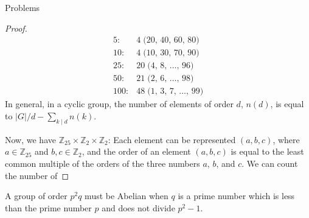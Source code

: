 \documentclass[12pt]{article}
\newcommand{\Z}{\mathbb{Z}}
\theoremstyle{definition}
\newenvironment{problem}[2][Problem]{\begin{trivlist}
\item[\hskip \labelsep {\bfseries #1}\hskip \labelsep {\bfseries #2.}]}{\end{trivlist}}
\begin{document}
\begin{section}{Problems}
\begin{problem}{12}
\begin{proof}
\begin{align*}
	    5: &4 \;\text{($20$, $40$, $60$, $80$)}\\
	    10: &4 \;\text{($10$, $30$, $70$, $90$)}\\
	    25: &20 \;\text{($4$, $8$, $\dots$, $96$)}\\
	    50: &21 \;\text{($2$, $6$, $\dots$, $98$)}\\
	    100: &48 \; \text{($1$, $3$, $7$, $\dots$, $99$)}
	\end{align*}
	In general, in a cyclic group, the number of elements of order $d$, $n(d)$, is equal to $\lvert G \rvert / d - \sum_{k \mid d} n(k)$.
	\par Now, we have $\Z_25 \times \Z_2 \times \Z_2$: Each element can be represented $(a,b, c)$, where $a \in \Z_25$ and $b, c \in \Z_2$, and the order of an element $(a,b,c)$ is equal to the least common multiple of the orders of the three numbers $a$, $b$, and $c$. We can count the number of 
	\end{proof}
\end{problem}
\begin{problem}{13}
	A group of order $p^2q$ must be Abelian when $q$ is a prime number which is less than the prime number $p$ and does not divide $p^2 - 1$.
	

\end{problem}
\end{section}
\end{document}
